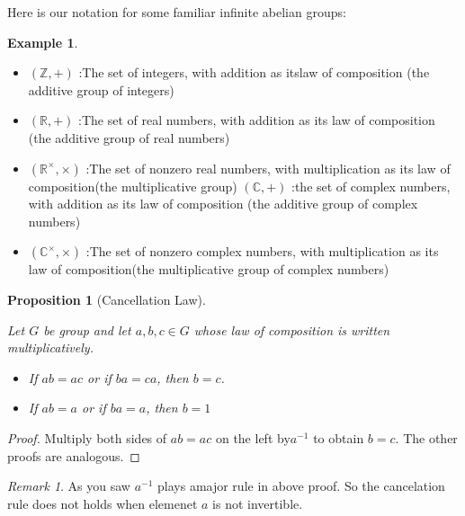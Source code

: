 \documentclass[
]{book}
\providecommand{\tightlist}{%
  \setlength{\itemsep}{0pt}\setlength{\parskip}{0pt}}
\newtheorem{proposition}{Proposition}[chapter]
\theoremstyle{definition}
\theoremstyle{definition}
\newtheorem{example}{Example}[chapter]
\theoremstyle{definition}
\theoremstyle{definition}
\theoremstyle{remark}
\newtheorem*{remark}{Remark}
\begin{document}
Here is our notation for some familiar infinite abelian groups:

\begin{example}
\protect\hypertarget{exm:unnamed-chunk-7}{}\label{exm:unnamed-chunk-7}\leavevmode

\begin{itemize}
\tightlist
\item
  \((\mathbb{Z},+)\) :The set of integers, with addition as itslaw of composition (the additive group of integers)
\item
  \((\mathbb{R},+)\) :The set of real numbers, with addition as its law of
  composition (the additive group of real numbers)
\item
  \((\mathbb{R}^\times,\times)\) :The set of nonzero real numbers, with multiplication as its law of composition(the multiplicative group)
  \((\mathbb{C},+)\) :the set of complex numbers, with addition as its law of composition (the additive group of complex numbers)
\item
  \((\mathbb{C}^\times,\times)\) :The set of nonzero complex numbers, with multiplication as its law of composition(the multiplicative group of complex numbers)
\end{itemize}

\end{example}

\begin{proposition}[Cancellation Law]
\protect\hypertarget{prp:unnamed-chunk-8}{}\label{prp:unnamed-chunk-8}

Let \(G\) be group and let \(a, b, c \in G\) whose law of composition is written multiplicatively.

\begin{itemize}
\tightlist
\item
  If \(ab = ac\) or if \(ba = ca\), then \(b = c\).
\item
  If \(a b = a\) or if \(ba = a\), then \(b = 1\)
\end{itemize}

\end{proposition}

\begin{proof}
Multiply both sides of \(ab=ac\) on the left by\(a^{-1}\) to obtain \(b = c\). The other proofs are analogous.
\end{proof}

\begin{remark}
As you saw \(a^{-1}\) plays amajor rule in above proof. So the cancelation rule does not holds when elemenet \(a\) is not invertible.
\end{remark}
\end{document}
